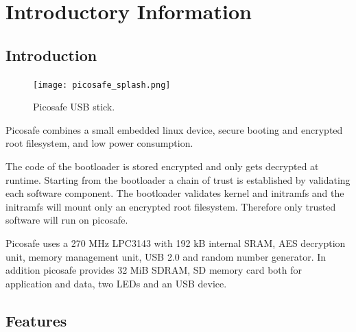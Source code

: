 \chapter{Introductory Information}

\section{Introduction}

\begin{figure}
  \begin{center}
    \texttt{[image: picosafe\_splash.png]}
  \end{center}
  \caption{Picosafe USB stick.}
\end{figure}

Picosafe combines a small embedded linux device, secure booting and encrypted
root filesystem, and low power consumption.

The code of the bootloader is stored encrypted and only gets decrypted at
runtime. Starting from the bootloader a chain of trust is established by
validating each software component. The bootloader validates kernel and
initramfs and the initramfs will mount only an encrypted root filesystem.
Therefore only trusted software will run on picosafe.

Picosafe uses a 270 MHz LPC3143 with 192 kB internal SRAM, AES decryption unit,
memory management unit, USB 2.0 and random number generator. In addition
picosafe provides 32 MiB SDRAM, SD memory card both for application and data,
two LEDs and an USB device.

\section{Features}

